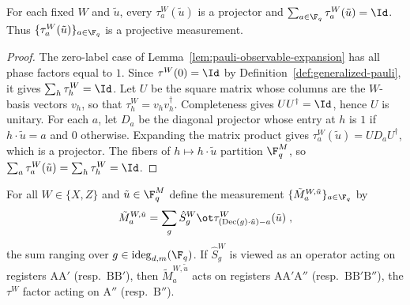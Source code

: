 \begin{lemma}\label{lem:tau-dot-product-projective}
	\leanok
	For each fixed $W$ and $\tilde{u}$, every $\tau^W_a(\tilde{u})$ is a projector and
	$\sum_{a\in\F_q}\tau^W_a(\tilde{u})=\Id$. Thus
	$\{\tau^W_a(\tilde{u})\}_{a\in\F_q}$ is a projective measurement.
\end{lemma}

\begin{proof}
	\leanok
	The zero-label case of Lemma~\ref{lem:pauli-observable-expansion} has
	all phase factors equal to $1$. Since $\tau^W(0)=\Id$ by
	Definition~\ref{def:generalized-pauli}, it gives $\sum_h\tau^W_h=\Id$.
	Let $U$ be the square matrix whose columns are the $W$-basis vectors $v_h$,
	so that $\tau^W_h=v_hv_h^\dagger$. Completeness gives $UU^\dagger=\Id$,
	hence $U$ is unitary. For each $a$, let $D_a$ be the diagonal projector
	whose entry at $h$ is $1$ if $h\cdot\tilde{u}=a$ and $0$ otherwise.
	Expanding the matrix product gives
	$\tau^W_a(\tilde{u})=UD_aU^\dagger$, which is a projector.
	The fibers of $h\mapsto h\cdot\tilde{u}$ partition $\F_q^M$, so
	$\sum_a\tau^W_a(\tilde{u})=\sum_h\tau^W_h=\Id$.
\end{proof}

\begin{definition}\label{def:tilde-m-measurement}
	\leanok
	For all $W \in \{X,Z\}$ and $\tilde{u} \in \F_q^{M}$ define the measurement $\{\tilde{M}^{W,\tilde{u}}_a\}_{a \in \F_q}$ by
	\begin{equation}\label{eq:tilde_M}
		\tilde{M}^{W,\tilde{u}}_a = \sum_{g} \hat{S}^W_g \ot \tau_{(\mathrm{Dec}(g) \cdot \tilde{u}) - a}^W(\tilde{u})\;,
	\end{equation}
	the sum ranging over $g \in \mathrm{ideg}_{d,m}(\F_q)$. If $\hat{S}^W_g$ is viewed as an operator acting on registers $\mathrm{A}\mathrm{A}'$ (resp.\ $\mathrm{B}\mathrm{B}'$), then $\tilde{M}^{W,\tilde{u}}_a$ acts on registers $\mathrm{A}\mathrm{A}'\mathrm{A}''$ (resp.\ $\mathrm{B}\mathrm{B}'\mathrm{B}''$), the $\tau^W$ factor acting on $\mathrm{A}''$ (resp.\ $\mathrm{B}''$).
\end{definition}

